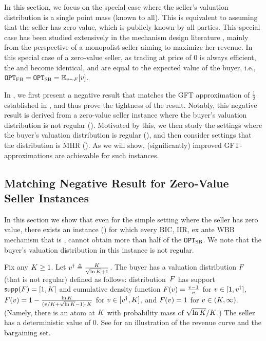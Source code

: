 
\label{sec:improved GFT}

In this section, we focus on the special case where the seller's valuation distribution is a single point mass (known to all). This is equivalent to assuming that the seller has zero value, which is publicly known by all parties. This special case has been studied extensively in the mechanism design literature \citep[e.g.,][]{mye-81,BR-89,HR-09}, mainly from the perspective of a monopolist seller aiming to maximize her revenue. In this special case of a zero-value seller, as trading at price of $0$ is always efficient, the {\FirstBest} and {\SecondBest} become identical, and are equal to the expected value of the buyer, i.e., $\OPTFB=\OPTSB = \expect[\val\sim\buyerdist]{\val}$. 

In , we first present a negative result that matches the GFT approximation of $\frac{1}{2}$ established in , and thus prove the tightness of the result. Notably, this negative result is derived from a zero-value seller instance  where the buyer's valuation distribution is not regular (). Motivated by this, we then study the settings where the buyer's valuation distribution is regular (), and then consider settings that the distribution is MHR (). As we will show, (significantly) improved GFT-approximations are achievable for such instances. 


\subsection{Matching Negative Result for Zero-Value Seller Instances}
\label{subsec:optimal GFT upper bound:general instance}
In this section we show that even for the simple setting where the seller has zero value, there exists an instance () for which every BIC, IIR, ex ante WBB mechanism that is {\ksfair}, cannot obtain more than half of the {\SecondBest} $\texttt{OPT}_{\textsc{SB}}$. We note that the buyer's valuation distribution in this instance is not regular. 

\begin{example}
\label{example:all fair mech:irregular}
Fix any $K \geq 1$. Let $v^\dagger \triangleq \frac{K}{\sqrt{\ln K} + 1}$. The buyer has a valuation distribution $F$ (that is not regular) defined as follows: %
distribution~$F$ 
has support ${\sf supp}(F)=[1, K]$ and cumulative density function $F(v) = \frac{v - 1}{v}$ for $v \in[1,v^\dagger]$, $F(v) = 1- \frac{{\ln K}}{(v/K+\sqrt{\ln K}-1)\cdot K}$ for $v\in[v^\dagger, K]$, and $F(v) = 1$ for $v \in(K, \infty)$.  
(Namely, there is an atom at $K$ with probability mass of ${\sqrt{\ln K}}/{K}$.)
The seller has a deterministic value of 0. See  for an illustration of the revenue curve and the bargaining set. 
\end{example}


